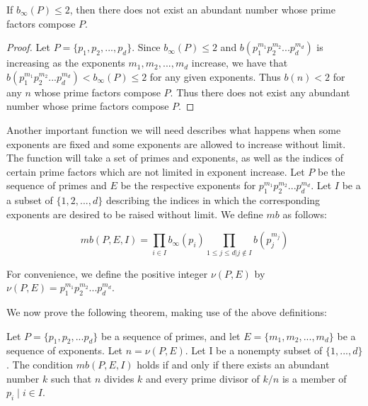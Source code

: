 \documentclass[../paper.tex]{article}
\begin{document}
\begin{theorem}
If $b_{\infty}(P) \leq 2$, then there does not exist an abundant
number whose prime factors compose $P$.
\end{theorem}

\begin{proof}
Let $P = \{p_1, p_2, ..., p_d\}$.
Since $b_{\infty}(P) \leq 2$ and $b(p_1^{m_1} p_2^{m_2} ... p_d^{m_d})$
is increasing as the exponents $m_1, m_2, ..., m_d$ increase, we have that
$b(p_1^{m_1} p_2^{m_2} ... p_d^{m_d}) < b_{\infty}(P) \leq 2$ for any 
given exponents. Thus $b(n) < 2$ for any $n$ whose prime factors
compose $P$. Thus there does not exist any abundant number whose 
prime factors compose $P$.

\end{proof}

Another important function we will need describes what happens 
when some exponents are fixed and some exponents are allowed to
increase without limit. 
The function will take a set of primes and exponents,
as well as the indices of certain prime factors which are not
limited in exponent increase. Let $P$ be the sequence of primes 
and $E$ be the respective exponents for 
$p_1^{m_1} p_2^{m_2} ... p_d^{m_d}$. Let $I$ be a a subset of
$\{1, 2, ..., d\}$ describing the indices in which the corresponding
exponents are desired to be raised without limit. We define $mb$ as 
follows:

\begin{equation}\label{mb_def}
  mb(P,E,I) = \prod_{i \in I} b_{\infty}(p_i) 
  \prod_{1 \leq j \leq d | j \notin I} b(p_j^{m_j})
\end{equation}


For convenience, we define the positive integer $\nu(P,E)$ by
$\nu(P,E) = p_1^{m_1} p_2^{m_2} ... p_d^{m_d}$. 

We now prove the following theorem, making use of the above
definitions:

\begin{theorem}
Let $P = \{p_1, p_2, ... p_d\}$ be a sequence of primes, and let
$E = \{m_1, m_2, ..., m_d\}$ be a sequence of exponents. Let $n =
\nu(P,E)$. Let I be a nonempty subset of $\{1, ..., d\}$. The 
condition $mb(P,E,I)$ holds if and only if there exists an 
abundant number $k$ such that $n$ divides $k$ and every prime 
divisor of $k/n$ is a member of ${p_i \mid i \in I}$.
\end{theorem}
\end{document}
